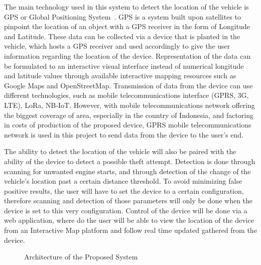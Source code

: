 \documentclass[conference]{IEEEtran}
\begin{document}
The main technology used in this system to detect the location of the vehicle is GPS or Global Positioning System~\cite{iotmounika,6132526,6803187,article1}. GPS is a system built upon satellites to pinpoint the location of an object with a GPS receiver in the form of Longitude and Latitude. These data can be collected via a device that is planted in the vehicle, which hosts a GPS receiver and used accordingly to give the user information regarding the location of the device. Representation of the data can be formulated to an interactive visual interface instead of numerical longitude and latitude values through available interactive mapping resources such as Google Maps and OpenStreetMap. Transmission of data from the device can use different technologies, such as mobile telecommunications interface (GPRS, 3G, LTE), LoRa, NB-IoT. However, with mobile telecommunications network offering the biggest coverage of area, especially in the country of Indonesia, and factoring in costs of production of the proposed device, GPRS mobile telecommunications network is used in this project to send data from the device to the user's end.

The ability to detect the location of the vehicle will also be paired with the ability of the device to detect a possible theft attempt. Detection is done through scanning for unwanted engine starts, and through detection of the change of the vehicle's location past a certain distance threshold. To avoid minimizing false positive results, the user will have to set the device to a certain configuration, therefore scanning and detection of those parameters will only be done when the device is set to this very configuration. Control of the device will be done via a web application, where do the user will be able to view the location of the device from an Interactive Map platform and follow real time updated gathered from the device.

\begin{figure}[ht!]
    \centering
    \def\svgwidth{\columnwidth}
    \scalebox{1.8}{}
    \caption{Architecture of the Proposed System}
    \label{fig1}
\end{figure}
\end{document}
